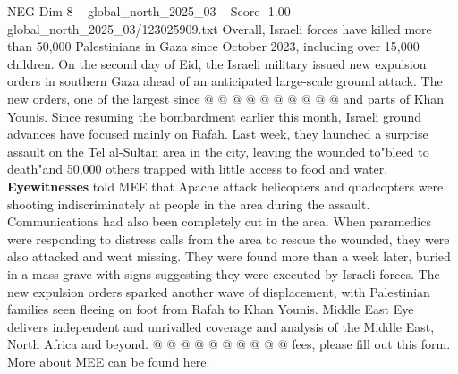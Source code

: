 \begin{textsample}{NEG Dim 8 – global\_north\_2025\_03 – Score -1.00 – global\_north\_2025\_03/123025909.txt}
Overall, Israeli forces have killed more than 50,000 Palestinians in Gaza since October 2023, including over 15,000 children.
On the second day of Eid, the Israeli military issued new expulsion orders in southern Gaza ahead of an anticipated large-scale ground attack.
The new orders, one of the largest since @ @ @ @ @ @ @ @ @ @ and parts of Khan Younis.
Since resuming the bombardment earlier this month, Israeli ground advances have focused mainly on Rafah.
Last week, they launched a surprise assault on the Tel al-Sultan area in the city, leaving the wounded to"bleed to death"and 50,000 others trapped with little access to food and water. \textbf{Eyewitnesses} told MEE that Apache attack helicopters and quadcopters were shooting indiscriminately at people in the area during the assault.
Communications had also been completely cut in the area.
When paramedics were responding to distress calls from the area to rescue the wounded, they were also attacked and went missing.
They were found more than a week later, buried in a mass grave with signs suggesting they were executed by Israeli forces.
The new expulsion orders sparked another wave of displacement, with Palestinian families seen fleeing on foot from Rafah to Khan Younis.
Middle East Eye delivers independent and unrivalled coverage and analysis of the Middle East, North Africa and beyond. @ @ @ @ @ @ @ @ @ @ fees, please fill out this form.
More about MEE can be found here.

\end{textsample}
